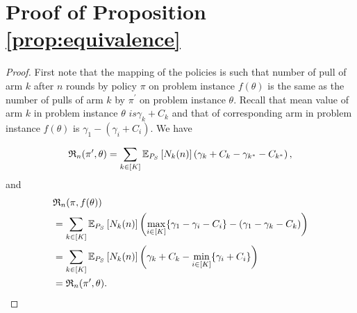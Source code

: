 \section*{Proof of Proposition \ref{prop:equivalence}}
\begin{proof}First note that the mapping of the policies is such that number of pull of arm $k$ after $n$ rounds by policy $\pi$ on problem instance $f(\theta)$ is the same as the number of pulls of arm $k$ by $\pi^\prime$ on problem instance $\theta$. Recall that mean value of arm $k$ in problem instance $\theta$ $ is \gamma_k +C_k$ and that of corresponding arm in problem instance $f(\theta)$ is $\gamma_1-(\gamma_i+C_i)$. We have
	
	\begin{align*}
	\mathfrak{R}_n(\pi^\prime,\theta) = \sum_{k\in [K]} \mathbb{E}_{P_S}\left[N_k(n)\right](\gamma_k+C_k-\gamma_{k^*}-C_{k^*}) \,,
	\end{align*}
	and
	\begin{align*}
	&\mathfrak{R}_n(\pi,f(\theta))\\
	&= \sum_{k\in [K]} \mathbb{E}_{P_S}\left[N_k(n)\right]\left (\max_{i \in [K]}\{\gamma_1-\gamma_i- C_i\}-(\gamma_1-\gamma_k- C_k)\right) \\
	&= \sum_{k\in [K]} \mathbb{E}_{P_S}\left[N_k(n)\right]\left (\gamma_k+ C_k - \min_{i \in [K]}\{\gamma_i+ C_i\}\right) \\
	&=\mathfrak{R}_n(\pi^\prime,\theta).
	\end{align*}
	\end{proof}
